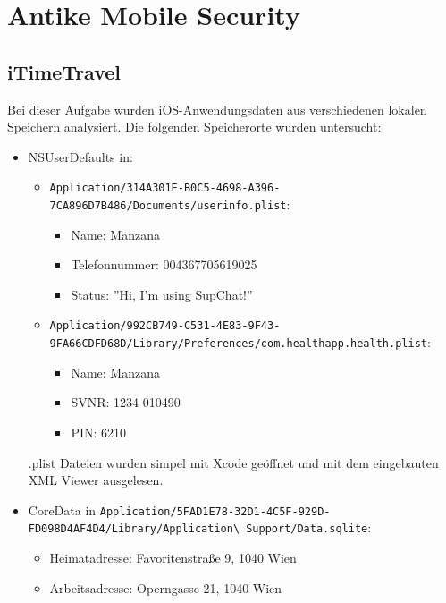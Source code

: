 \documentclass[12pt, a4paper, titlepage, oneside]{scrartcl}
\begin{document}
	\newpage
	

	\section{Antike Mobile Security}

	\subsection{iTimeTravel}
	Bei dieser Aufgabe wurden iOS-Anwendungsdaten aus verschiedenen lokalen Speichern
	analysiert. Die folgenden Speicherorte wurden untersucht:

	\begin{itemize}
		\item NSUserDefaults in:
			\begin{itemize}
				\item \lstinline{Application/314A301E-B0C5-4698-A396-7CA896D7B486/Documents/userinfo.plist}:
					\begin{itemize}
						\item Name: Manzana

						\item Telefonnummer: 004367705619025

						\item Status: ''Hi, I'm using SupChat!''
					\end{itemize}

				\item \lstinline{Application/992CB749-C531-4E83-9F43-9FA66CDFD68D/Library/Preferences/com.healthapp.health.plist}:
					\begin{itemize}
						\item Name: Manzana

						\item SVNR: 1234 010490

						\item PIN: 6210
					\end{itemize}
			\end{itemize}
			.plist Dateien wurden simpel mit Xcode geöffnet und mit dem eingebauten XML
			Viewer ausgelesen.

		\item CoreData in \lstinline{Application/5FAD1E78-32D1-4C5F-929D-FD098D4AF4D4/Library/Application\ Support/Data.sqlite}:
			\begin{itemize}
				\item Heimatadresse: Favoritenstraße 9, 1040 Wien

				\item Arbeitsadresse: Operngasse 21, 1040 Wien


\end{itemize}
\end{itemize}
\end{document}

